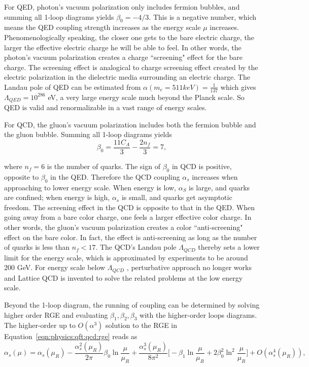 For QED, photon's vacuum polarization only includes fermion bubbles, and summing all 1-loop diagrams yields $\beta_0 = -4/3$. This is a negative number, which means the QED coupling strength increases as the energy scale $\mu$ increases. Phenomenologically speaking,  the closer one gets to the bare electric charge, the larger the effective electric charge he will be able to feel. In other words, the photon's vacuum polarization creates a charge ``screening" effect for the bare charge. The screening effect is analogical to charge screening effect created by the electric polarization in the dielectric media surrounding an electric charge. The Landau pole of QED can be estimated from $\alpha(m_e=511keV) = \frac{1}{137}$ which gives $\Lambda_{QED}=10^{286}$ eV, a very large energy scale much beyond the Planck scale. So QED is valid and renormalizable in a vast range of energy scales.



For QCD, the gluon's vacuum polarization includes both the fermion bubble and the gluon bubble. Summing all 1-loop diagrams yields
\begin{equation}
	\beta_0 = \frac{11C_A}{3} - \frac{2 n_f}{3} = 7 , 
\end{equation}

\noindent where $n_f=6$ is the number of quarks. The sign of $\beta_0$  in QCD is positive, opposite to $\beta_0$ in the QED. Therefore the QCD coupling $\alpha_s$  increases when approaching to lower energy scale. When energy is low, $\alpha_S$ is large, and quarks are confined; when energy is high, $\alpha_s$ is small, and quarks get asymptotic freedom. The screening effect in the QCD is opposite to that in the QED. When going away from a bare color charge, one feels a larger effective color charge. In other words, the gluon's vacuum polarization creates a color ``anti-screening" effect on the bare color. In fact, the effect is anti-screening as long as the number of quarks is less than $n_f<17$. The QCD's Landau pole $\Lambda_{QCD}$ thereby sets a lower limit for the energy scale, which is approximated by experiments to be around $200$ GeV. For energy scale below $\Lambda_{QCD}$ , perturbative approach no longer works and Lattice QCD is invented to solve the related problems at the low energy scale.


Beyond the 1-loop diagram, the running of coupling can be determined by solving higher order RGE and evaluating $\beta_1,\beta_2,\beta_3$ with the higher-order loops diagrams. The higher-order up to $O(\alpha^3)$ solution to the RGE in Equation~\ref{eqn:physics:qft:qcd:rge} reads as \cite{schwartz2014quantum}
\begin{equation}
    \alpha_s(\mu) = \alpha_s(\mu_R) - \frac{\alpha^2_s(\mu_R)}{2\pi}\beta_0 \ln \frac{\mu}{\mu_R} + \frac{\alpha^3_s(\mu_R)}{8\pi^2} \bigg[ -\beta_1 \ln \frac{\mu}{\mu_R}  + 2 \beta_0 ^2 \ln^2 \frac{\mu}{\mu_R} \bigg ] + O(\alpha^4_s(\mu_R)), 
    \label{eqn:physics:qft:qcd:higherOrderRunning}
\end{equation}


